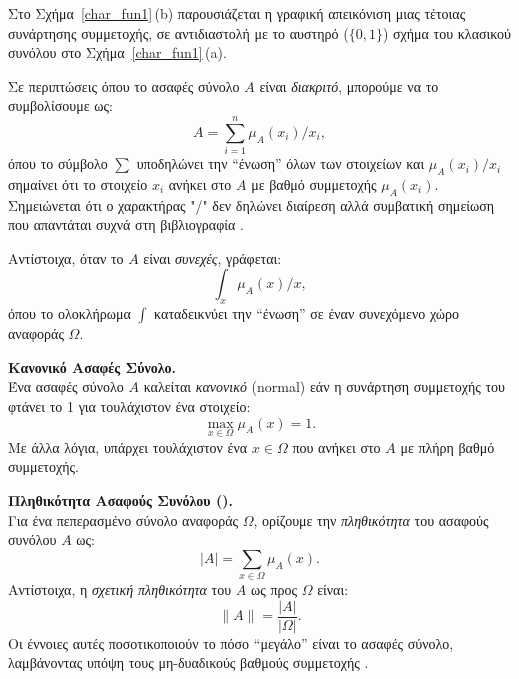 Στο Σχήμα~\ref{char_fun1}\,(\textlatin{b}) παρουσιάζεται η γραφική απεικόνιση μιας τέτοιας συνάρτησης συμμετοχής, σε αντιδιαστολή με το αυστηρό (\(\{0,1\}\)) σχήμα του κλασικού συνόλου στο Σχήμα~\ref{char_fun1}\,(\textlatin{a}). 

\medskip
Σε περιπτώσεις όπου το ασαφές σύνολο \(A\) είναι \emph{διακριτό}, μπορούμε να το συμβολίσουμε ως:
\begin{equation}
\label{eq:2}
A = \sum_{i=1}^{n} \mu_{A}(x_{i})/x_{i},
\end{equation}
όπου το σύμβολο \(\sum\) υποδηλώνει την ``ένωση'' όλων των στοιχείων και \(\mu_{A}(x_{i})/x_{i}\) σημαίνει ότι το στοιχείο \(x_{i}\) ανήκει στο \(A\) με βαθμό συμμετοχής \(\mu_{A}(x_{i})\). Σημειώνεται ότι ο χαρακτήρας "/" δεν δηλώνει διαίρεση αλλά συμβατική σημείωση που απαντάται συχνά στη βιβλιογραφία \cite{DuboisPrade1980}.

\medskip
Αντίστοιχα, όταν το \(A\) είναι \emph{συνεχές}, γράφεται:
\begin{equation}
\label{eq:3}
\int_{x} \mu_{A}(x)/x,
\end{equation}
όπου το ολοκλήρωμα \(\int\) καταδεικνύει την ``ένωση'' σε έναν συνεχόμενο χώρο αναφοράς \(\Omega\).

\begin{definition}
	\label{def:normal}
	\textbf{Κανονικό Ασαφές Σύνολο.}\\
	Ένα ασαφές σύνολο \(A\) καλείται \emph{κανονικό} (\textlatin{normal}) εάν η συνάρτηση συμμετοχής του φτάνει το 1 για τουλάχιστον ένα στοιχείο:
	\begin{equation}
	\label{eq:4}
	\max_{x \in \Omega} \mu_{A}(x) = 1.
	\end{equation}
	Με άλλα λόγια, υπάρχει τουλάχιστον ένα \(x \in \Omega\) που ανήκει στο \(A\) με πλήρη βαθμό συμμετοχής.
\end{definition}

\begin{definition}
	\textbf{Πληθικότητα Ασαφούς Συνόλου ().}\\
	Για ένα πεπερασμένο σύνολο αναφοράς \(\Omega\), ορίζουμε την \emph{πληθικότητα} του ασαφούς συνόλου \(A\) ως:
	\begin{equation}
	\label{eq:5}
	|A| = \sum_{x \in \Omega} \mu_{A}(x).
	\end{equation}
	Αντίστοιχα, η \emph{σχετική πληθικότητα} του \(A\) ως προς \(\Omega\) είναι:
	\begin{equation}
	\|A\| = \frac{|A|}{|\Omega|}.
	\end{equation}
	Οι έννοιες αυτές ποσοτικοποιούν το πόσο ``μεγάλο'' είναι το ασαφές σύνολο, λαμβάνοντας υπόψη τους μη-δυαδικούς βαθμούς συμμετοχής \cite{KlirYuan}.
\end{definition}


